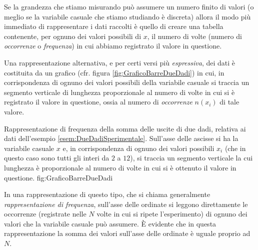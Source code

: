 Se la grandezza che stiamo misurando pu\`o assumere un numero
finito di valori (o meglio se la variabile casuale che stiamo
studiando \`e discreta) allora il modo pi\`u immediato di rappresentare
i dati raccolti \`e quello di creare una tabella contenente,
per ognuno dei valori possibili di $x$, il numero di volte
(numero di {\itshape occorrenze} o {\itshape frequenza}) in cui abbiamo
registrato il valore in questione.

\begin{exemplify}


\end{exemplify}

\noindent Una rappresentazione alternativa, e per certi versi pi\`u
{\itshape espressiva}, dei dati \`e costituita da un grafico
(cfr. figura \ref{fig:GraficoBarreDueDadi}) in cui, in corrispondenza di
ognuno dei valori possibili della variabile casuale si traccia un segmento
verticale di lunghezza proporzionale al numero di volte in cui si \`e
registrato il valore in questione, ossia al numero di {\itshape occorrenze}
$n(x_i)$ di tale valore.

\panelfig
{}
{Rappresentazione di frequenza della somma delle uscite
di due dadi, relativa ai dati dell'esempio \ref{esem:DueDadiSperimentale}.
Sull'asse delle ascisse si ha la variabile
casuale $x$ e, in corrispondenza di ognuno dei valori possibili $x_i$
(che in questo caso sono tutti gli interi da $2$ a $12$), si traccia un
segmento verticale la cui lunghezza \`e proporzionale al numero di volte
in cui si \`e ottenuto il valore in questione.}
{fig:GraficoBarreDueDadi}

In una rappresentazione di questo tipo, che si chiama generalmente
{\itshape rappresentazione di frequenza}, sull'asse delle ordinate
si leggono direttamente le occorrenze (registrate nelle $N$ volte
in cui si ripete l'esperimento) di ognuno dei valori che la variabile
casuale pu\`o assumere. \`E evidente che in questa rappresentazione la
somma dei valori sull'asse delle ordinate \`e uguale proprio ad $N$.

